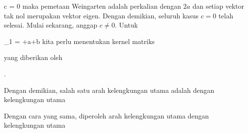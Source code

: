 \mavergleichskette
{\vergleichskette
{ c
}
{ = }{ 0
}
{  }{
}
{    }{
}
{   }{
}
}
{}{}{}
maka pemetaan Weingarten adalah perkalian dengan $2a$ dan setiap vektor tak nol merupakan vektor eigen. Dengan demikian, seluruh kasus $c=0$ telah selesai. Mulai sekarang, anggap $c\neq 0$. Untuk

\mavergleichskettedisp
{\vergleichskette
{ \lambda_{1}
}
{ =} {  +a+b
}
{ } {
}
{ } {
}
{ } {
}
}
{}{}{}
kita perlu menentukan kernel matriks

 {  }

yang diberikan oleh

 { . }

Dengan demikian, salah satu arah kelengkungan utama adalah
 dengan kelengkungan utama

Dengan cara yang sama, diperoleh arah kelengkungan utama
 dengan kelengkungan utama
